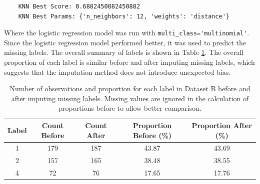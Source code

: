 \documentclass{article}
\begin{document}
\begin{enumerate}[label=\alph*)]
\begin{verbatim}
    KNN Best Score: 0.6882450882450882
    KNN Best Params: {'n_neighbors': 12, 'weights': 'distance'}
    \end{verbatim}
    Where the logistic regression model was run with \verb|multi_class='multinomial'|. Since the logistic regression model performed better, it was used to predict the missing labels. The overall summary of labels is shown in Table \ref{tab:Q2d_label_counts}. The overall proportion of each label is similar before and after imputing missing labels, which suggests that the imputation method does not introduce unexpected bias.
    \begin{table}[!htb]
        \centering
        \begin{tabular}{c||c|c||c|c}
            \textbf{Label} & \textbf{Count Before} & \textbf{Count After} & \textbf{Proportion Before (\%)} & \textbf{Proportion After (\%)} \\ \hline
            1 & 179 & 187 & 43.87 & 43.69 \\ \hline
            2 & 157 & 165 & 38.48 & 38.55 \\ \hline
            4 & 72 & 76 & 17.65 & 17.76 \\
        \end{tabular}
        \caption{Number of observations and proportion for each label in Dataset B before and after imputing missing labels. Missing values are ignored in the calculation of proportions before to allow better comparison.}
        \label{tab:Q2d_label_counts}
    \end{table}
\end{enumerate}

\newpage
\end{document}
